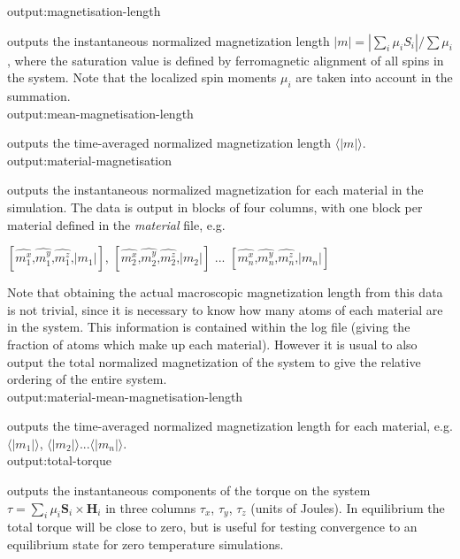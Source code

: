 {\zicf output:magnetisation-length} outputs the instantaneous normalized magnetization length $|m| = |\sum_i \mu_i S_i| / \sum \mu_i$, where the saturation value is defined by ferromagnetic alignment of all spins in the system. Note that the localized spin moments $\mu_i$ are taken into account in the summation.\\

{\zicf output:mean-magnetisation-length} outputs the time-averaged normalized magnetization length $\langle|m|\rangle$.\\

{\zicf output:material-magnetisation} outputs the instantaneous normalized magnetization for each material in the simulation. The data is output in blocks of four columns, with one block per material defined in the \textit{material} file, e.g.

\begin{center}
$\left[ \hat{m_1^x} \textrm{,} \hat{m_1^y} \textrm{,} \hat{m_1^z} \textrm{,} |m_1| \right]$,
$\left[ \hat{m_2^x} \textrm{,} \hat{m_2^y} \textrm{,} \hat{m_2^z} \textrm{,} |m_2| \right]$ ...
$\left[ \hat{m_n^x} \textrm{,} \hat{m_n^y} \textrm{,} \hat{m_n^z} \textrm{,} |m_n| \right]$
\end{center}

Note that obtaining the actual macroscopic magnetization length from this data is not trivial, since it is necessary to know how many atoms of each material are in the system. This information is contained within the log file (giving the fraction of atoms which make up each material). However it is usual to also output the total normalized magnetization of the system to give the relative ordering of the entire system.\\

{\zicf output:material-mean-magnetisation-length} outputs the time-averaged normalized magnetization length for each material, e.g. $\langle|m_1|\rangle$, $\langle|m_2|\rangle$...$\langle|m_n|\rangle$.\\

{\zicf output:total-torque} outputs the instantaneous components of the torque on the system $\tau = \sum_i \mu_i \mathbf{S}_i \times \mathbf{H}_i$ in three columns $\tau_x$, $\tau_y$, $\tau_z$ (units of Joules). In equilibrium the total torque will be close to zero, but is useful for testing convergence to an equilibrium state for zero temperature simulations.\\

